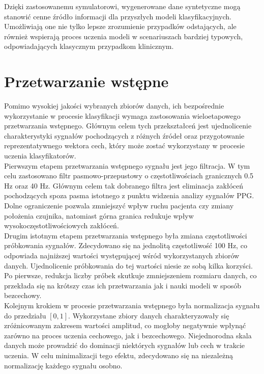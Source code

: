 \documentclass[a4paper,twoside,12pt]{book}
\begin{document}
Dzięki zastosowanemu symulatorowi, wygenerowane dane syntetyczne mogą stanowić cenne źródło informacji dla przyszłych modeli klasyfikacyjnych. Umożliwiają one nie tylko lepsze zrozumienie przypadków odstających, ale również wspierają proces uczenia modeli w scenariuszach bardziej typowych, odpowiadających klasycznym przypadkom klinicznym.

\section{Przetwarzanie wstępne}
Pomimo wysokiej jakości wybranych zbiorów danych, ich bezpośrednie wykorzystanie w procesie klasyfikacji wymaga zastosowania wieloetapowego przetwarzania wstępnego. Głównym celem tych przekształceń jest ujednolicenie charakterystyki sygnałów pochodzących z różnych źródeł oraz przygotowanie reprezentatywnego wektora cech, który może zostać wykorzystany w procesie uczenia klasyfikatorów.\\

Pierwszym etapem przetwarzania wstępnego sygnału jest jego filtracja. W tym celu zastosowano filtr pasmowo-przepustowy o częstotliwościach granicznych 0.5 Hz oraz 40 Hz. Głównym celem tak dobranego filtra jest eliminacja zakłóceń pochodzących spoza pasma istotnego z punktu widzenia analizy sygnałów PPG. Dolne ograniczenie pozwala zmniejszyć wpływ ruchu pacjenta czy zmiany położenia czujnika, natomiast górna granica redukuje wpływ wysokoczęstotliwościowych zakłóceń.\\

Drugim istotnym etapem przetwarzania wstępnego była zmiana częstotliwości próbkowania sygnałów. Zdecydowano się na jednolitą częstotliwość 100 Hz, co odpowiada najniższej wartości występującej wśród wykorzystanych zbiorów danych. Ujednolicenie próbkowania do tej wartości niesie ze sobą kilka korzyści. Po pierwsze, redukcja liczby próbek skutkuje zmniejszeniem rozmiaru danych, co przekłada się na krótszy czas ich przetwarzania jak i nauki modeli w sposób bezcechowy.\\

Kolejnym krokiem w procesie przetwarzania wstępnego była normalizacja sygnału do przedziału $[0, 1]$. Wykorzystane zbiory danych charakteryzowały się zróżnicowanym zakresem wartości amplitud, co mogłoby negatywnie wpłynąć zarówno na proces uczenia cechowego, jak i bezcechowego. Niejednorodna skala danych może prowadzić do dominacji niektórych sygnałów lub cech w trakcie uczenia. W celu minimalizacji tego efektu, zdecydowano się na niezależną normalizację każdego sygnału osobno.\\
\end{document}
